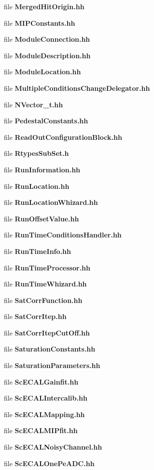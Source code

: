 \begin{DoxyCompactItemize}
file {\bfseries Merged\-Hit\-Origin.\-hh}
\item 
file {\bfseries M\-I\-P\-Constants.\-hh}
\item 
file {\bfseries Module\-Connection.\-hh}
\item 
file {\bfseries Module\-Description.\-hh}
\item 
file {\bfseries Module\-Location.\-hh}
\item 
file {\bfseries Multiple\-Conditions\-Change\-Delegator.\-hh}
\item 
file {\bfseries N\-Vector\-\_\-t.\-hh}
\item 
file {\bfseries Pedestal\-Constants.\-hh}
\item 
file {\bfseries Read\-Out\-Configuration\-Block.\-hh}
\item 
file {\bfseries Rtypes\-Sub\-Set.\-h}
\item 
file {\bfseries Run\-Information.\-hh}
\item 
file {\bfseries Run\-Location.\-hh}
\item 
file {\bfseries Run\-Location\-Whizard.\-hh}
\item 
file {\bfseries Run\-Offset\-Value.\-hh}
\item 
file {\bfseries Run\-Time\-Conditions\-Handler.\-hh}
\item 
file {\bfseries Run\-Time\-Info.\-hh}
\item 
file {\bfseries Run\-Time\-Processor.\-hh}
\item 
file {\bfseries Run\-Time\-Whizard.\-hh}
\item 
file {\bfseries Sat\-Corr\-Function.\-hh}
\item 
file {\bfseries Sat\-Corr\-Itep.\-hh}
\item 
file {\bfseries Sat\-Corr\-Itep\-Cut\-Off.\-hh}
\item 
file {\bfseries Saturation\-Constants.\-hh}
\item 
file {\bfseries Saturation\-Parameters.\-hh}
\item 
file {\bfseries Sc\-E\-C\-A\-L\-Gainfit.\-hh}
\item 
file {\bfseries Sc\-E\-C\-A\-L\-Intercalib.\-hh}
\item 
file {\bfseries Sc\-E\-C\-A\-L\-Mapping.\-hh}
\item 
file {\bfseries Sc\-E\-C\-A\-L\-M\-I\-Pfit.\-hh}
\item 
file {\bfseries Sc\-E\-C\-A\-L\-Noisy\-Channel.\-hh}
\item 
file {\bfseries Sc\-E\-C\-A\-L\-One\-Pe\-A\-D\-C.\-hh}

\end{DoxyCompactItemize}
